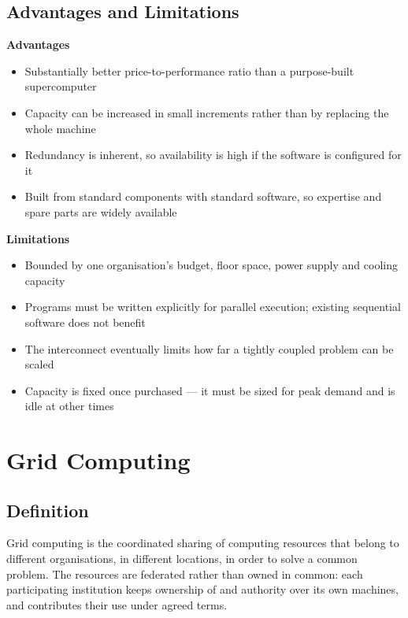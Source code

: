 \documentclass[../main.tex]{subfiles}
\begin{document}
\subsection{Advantages and Limitations}

\textbf{Advantages}
\begin{itemize}
  \item Substantially better price-to-performance ratio than a purpose-built
        supercomputer
  \item Capacity can be increased in small increments rather than by
        replacing the whole machine
  \item Redundancy is inherent, so availability is high if the software is
        configured for it
  \item Built from standard components with standard software, so expertise
        and spare parts are widely available
\end{itemize}

\textbf{Limitations}
\begin{itemize}
  \item Bounded by one organisation's budget, floor space, power supply and
        cooling capacity
  \item Programs must be written explicitly for parallel execution; existing
        sequential software does not benefit
  \item The interconnect eventually limits how far a tightly coupled problem
        can be scaled
  \item Capacity is fixed once purchased --- it must be sized for peak demand
        and is idle at other times
\end{itemize}

\section{Grid Computing}

\subsection{Definition}

Grid computing is the coordinated sharing of computing resources that belong
to different organisations, in different locations, in order to solve a
common problem. The resources are federated rather than owned in common: each
participating institution keeps ownership of and authority over its own
machines, and contributes their use under agreed terms.
\end{document}
